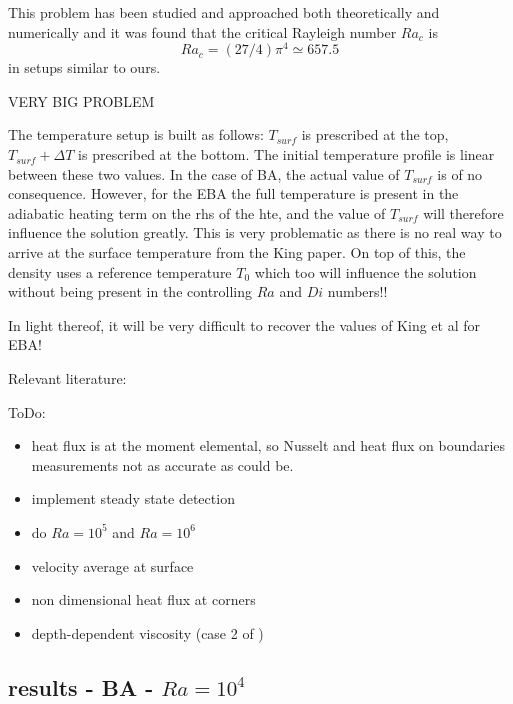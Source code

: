 This problem has been studied and approached both theoretically and numerically \cite[e.g.]{tusc} and it was found that
the critical Rayleigh number $Ra_c$ is 
\[
Ra_c=(27/4)\pi^4 \simeq 657.5
\]
in setups similar to ours.


\vspace{3cm}



{\color{red} VERY BIG PROBLEM}

The temperature setup is built as follows: $T_{surf}$ is prescribed at the top, 
$T_{surf}+\Delta T$ is prescribed at the bottom. The initial temperature profile is linear between these two values. 
In the case of BA, the actual value of $T_{surf}$ is of no consequence. However, for the EBA the full temperature is present in the adiabatic heating term on the rhs of the hte, and the value of $T_{surf}$ will therefore influence the solution greatly. This is very problematic as there is no real way to arrive at the surface temperature from the King paper. On top of this, the density uses a reference temperature $T_0$ which too will influence the solution without being present in the controlling $Ra$ and $Di$ numbers!!

In light thereof, it will be very difficult to recover the values of King et al for EBA!

\vspace{3cm}


Relevant literature: \cite{besg92,itki94,tagu07,lezh08,kilv10,lezh11,lizh13,hedg17}


ToDo: 
\begin{itemize}
\item heat flux is at the moment elemental, so Nusselt and heat flux on boundaries measurements not as accurate as could be.
\item implement steady state detection
\item do $Ra=10^5$ and $Ra=10^6$
\item velocity average at surface
\item non dimensional heat flux at corners \cite{blbc89} 
\item depth-dependent viscosity (case 2 of \cite{blbc89})
\end{itemize}

\newpage
\subsection*{results - BA - $Ra=10^4$}


